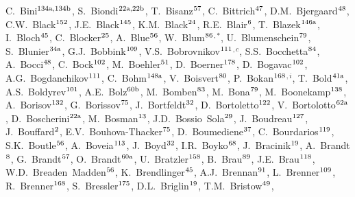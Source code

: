 \begin{flushleft}
C.~Bini$^\textrm{\scriptsize 134a,134b}$,
S.~Biondi$^\textrm{\scriptsize 22a,22b}$,
T.~Bisanz$^\textrm{\scriptsize 57}$,
C.~Bittrich$^\textrm{\scriptsize 47}$,
D.M.~Bjergaard$^\textrm{\scriptsize 48}$,
C.W.~Black$^\textrm{\scriptsize 152}$,
J.E.~Black$^\textrm{\scriptsize 145}$,
K.M.~Black$^\textrm{\scriptsize 24}$,
R.E.~Blair$^\textrm{\scriptsize 6}$,
T.~Blazek$^\textrm{\scriptsize 146a}$,
I.~Bloch$^\textrm{\scriptsize 45}$,
C.~Blocker$^\textrm{\scriptsize 25}$,
A.~Blue$^\textrm{\scriptsize 56}$,
W.~Blum$^\textrm{\scriptsize 86}$$^{,*}$,
U.~Blumenschein$^\textrm{\scriptsize 79}$,
S.~Blunier$^\textrm{\scriptsize 34a}$,
G.J.~Bobbink$^\textrm{\scriptsize 109}$,
V.S.~Bobrovnikov$^\textrm{\scriptsize 111}$$^{,c}$,
S.S.~Bocchetta$^\textrm{\scriptsize 84}$,
A.~Bocci$^\textrm{\scriptsize 48}$,
C.~Bock$^\textrm{\scriptsize 102}$,
M.~Boehler$^\textrm{\scriptsize 51}$,
D.~Boerner$^\textrm{\scriptsize 178}$,
D.~Bogavac$^\textrm{\scriptsize 102}$,
A.G.~Bogdanchikov$^\textrm{\scriptsize 111}$,
C.~Bohm$^\textrm{\scriptsize 148a}$,
V.~Boisvert$^\textrm{\scriptsize 80}$,
P.~Bokan$^\textrm{\scriptsize 168}$$^{,i}$,
T.~Bold$^\textrm{\scriptsize 41a}$,
A.S.~Boldyrev$^\textrm{\scriptsize 101}$,
A.E.~Bolz$^\textrm{\scriptsize 60b}$,
M.~Bomben$^\textrm{\scriptsize 83}$,
M.~Bona$^\textrm{\scriptsize 79}$,
M.~Boonekamp$^\textrm{\scriptsize 138}$,
A.~Borisov$^\textrm{\scriptsize 132}$,
G.~Borissov$^\textrm{\scriptsize 75}$,
J.~Bortfeldt$^\textrm{\scriptsize 32}$,
D.~Bortoletto$^\textrm{\scriptsize 122}$,
V.~Bortolotto$^\textrm{\scriptsize 62a}$,
D.~Boscherini$^\textrm{\scriptsize 22a}$,
M.~Bosman$^\textrm{\scriptsize 13}$,
J.D.~Bossio~Sola$^\textrm{\scriptsize 29}$,
J.~Boudreau$^\textrm{\scriptsize 127}$,
J.~Bouffard$^\textrm{\scriptsize 2}$,
E.V.~Bouhova-Thacker$^\textrm{\scriptsize 75}$,
D.~Boumediene$^\textrm{\scriptsize 37}$,
C.~Bourdarios$^\textrm{\scriptsize 119}$,
S.K.~Boutle$^\textrm{\scriptsize 56}$,
A.~Boveia$^\textrm{\scriptsize 113}$,
J.~Boyd$^\textrm{\scriptsize 32}$,
I.R.~Boyko$^\textrm{\scriptsize 68}$,
J.~Bracinik$^\textrm{\scriptsize 19}$,
A.~Brandt$^\textrm{\scriptsize 8}$,
G.~Brandt$^\textrm{\scriptsize 57}$,
O.~Brandt$^\textrm{\scriptsize 60a}$,
U.~Bratzler$^\textrm{\scriptsize 158}$,
B.~Brau$^\textrm{\scriptsize 89}$,
J.E.~Brau$^\textrm{\scriptsize 118}$,
W.D.~Breaden~Madden$^\textrm{\scriptsize 56}$,
K.~Brendlinger$^\textrm{\scriptsize 45}$,
A.J.~Brennan$^\textrm{\scriptsize 91}$,
L.~Brenner$^\textrm{\scriptsize 109}$,
R.~Brenner$^\textrm{\scriptsize 168}$,
S.~Bressler$^\textrm{\scriptsize 175}$,
D.L.~Briglin$^\textrm{\scriptsize 19}$,
T.M.~Bristow$^\textrm{\scriptsize 49}$,
$$
\end{flushleft}
